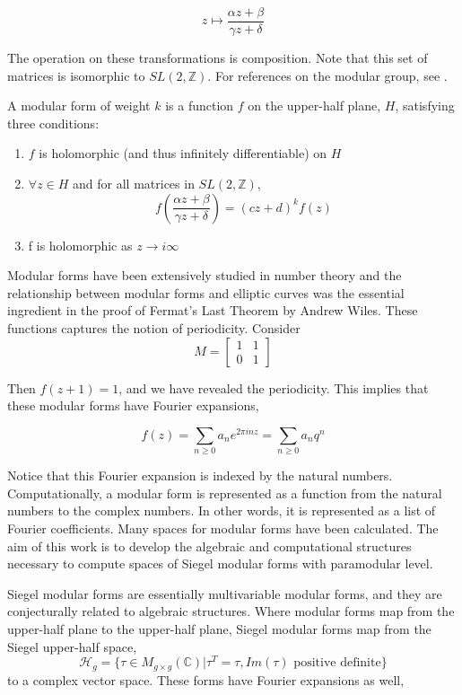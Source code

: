 \documentclass[11pt, oneside]{amsart}
\begin{document}
\[
z \mapsto \frac{\alpha z + \beta}{\gamma z + \delta}
\]

The operation on these transformations is composition. Note that this set of matrices is isomorphic to $SL(2, \mathbb{Z})$.  For references on the modular group, see \cite{Stein}.

A modular form of weight $k$ is a function $f$ on the upper-half plane, $H$, satisfying three conditions:

\begin{enumerate}
	\item $f$ is holomorphic (and thus infinitely differentiable) on $H$
	\item $\forall z \in H$ and for all matrices in $SL(2, \mathbb{Z})$,
	$$f\left( \frac{\alpha z + \beta}{\gamma z + \delta} \right) = (cz+d)^k f(z)$$
	\item f is holomorphic as $z\rightarrow i\infty$
\end{enumerate}

Modular forms have been extensively studied in number theory and the relationship between modular forms and elliptic curves was the essential ingredient in the proof of Fermat's Last Theorem by Andrew Wiles. These functions captures the notion of periodicity. Consider 
\[
M=
\begin{bmatrix}
1 & 1 \\
0 & 1
\end{bmatrix}
\]

Then $f(z+1)=1$, and we have revealed the periodicity. This implies that these modular forms have Fourier expansions,

$$f(z)=\sum_{n\geq 0} a_n e^{2\pi i n z} = \sum_{n\geq 0} a_n q^n$$

Notice that this Fourier expansion is indexed by the natural numbers. Computationally, a modular form is represented as a function from the natural numbers to the complex numbers. In other words, it is represented as a list of Fourier coefficients. Many spaces for modular forms have been calculated. The aim of this work is to develop the algebraic and computational structures necessary to compute spaces of Siegel modular forms with paramodular level.

Siegel modular forms are essentially multivariable modular forms, and they are conjecturally related to algebraic structures. Where modular forms map from the upper-half plane to the upper-half plane, Siegel modular forms map from the Siegel upper-half space, $$\mathcal{H}_g = \{\tau \in M_{g\times g}(\mathbb{C}) \vert \tau^T = \tau, Im(\tau) \text{ positive definite}\}$$to a complex vector space. These forms have Fourier expansions as well,
\end{document}
